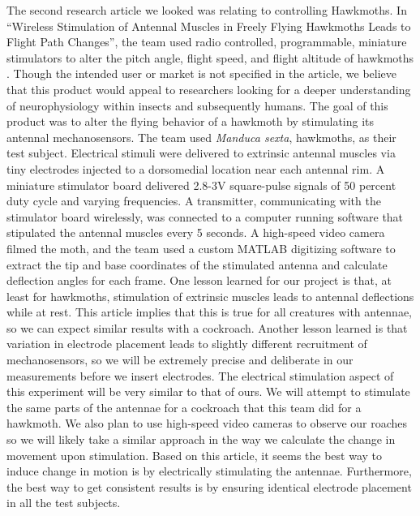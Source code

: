 \documentclass{article}
\begin{document}
\par The second research article we looked was relating to controlling Hawkmoths. In ``Wireless Stimulation of Antennal Muscles in Freely Flying Hawkmoths Leads to Flight Path Changes'', the team used radio controlled, programmable, miniature stimulators to alter the pitch angle, flight speed, and flight altitude of hawkmoths \cite{hinterwirth2012wireless}. Though the intended user or market is not specified in the article, we believe that this product would appeal to researchers looking for a deeper understanding of neurophysiology within insects and subsequently humans. The goal of this product was to alter the flying behavior of a hawkmoth by stimulating its antennal mechanosensors. The team used \emph{Manduca sexta}, hawkmoths, as their test subject. Electrical stimuli were delivered to extrinsic antennal muscles via tiny electrodes injected to a dorsomedial location near each antennal rim. A miniature stimulator board delivered 2.8-3V square-pulse signals of 50 percent duty cycle and varying frequencies. A transmitter, communicating with the stimulator board wirelessly, was connected to a computer running software that stipulated the antennal muscles every 5 seconds. A high-speed video camera filmed the moth, and the team used a custom MATLAB digitizing software to extract the tip and base coordinates of the stimulated antenna and calculate deflection angles for each frame. One lesson learned for our project is that, at least for hawkmoths, stimulation of extrinsic muscles leads to antennal deflections while at rest. This article implies that this is true for all creatures with antennae, so we can expect similar results with a cockroach. Another lesson learned is that variation in electrode placement leads to slightly different recruitment of mechanosensors, so we will be extremely precise and deliberate in our measurements before we insert electrodes. The electrical stimulation aspect of this experiment will be very similar to that of ours. We will attempt to stimulate the same parts of the antennae for a cockroach that this team did for a hawkmoth. We also plan to use high-speed video cameras to observe our roaches so we will likely take a similar approach in the way we calculate the change in movement upon stimulation. Based on this article, it seems the best way to induce change in motion is by electrically stimulating the antennae. Furthermore, the best way to get consistent results is by ensuring identical electrode placement in all the test subjects. 

\bigskip
\end{document}
